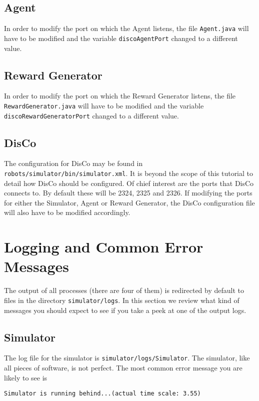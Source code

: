 \documentclass[12pt]{article}
\begin{document}
\subsection{Agent}

In order to modify the port on which the Agent listens, the file 
\verb+Agent.java+ will have to be modified and the variable \verb+discoAgentPort+ changed to a different value.

\subsection{Reward Generator}

In order to modify the port on which the Reward Generator listens, the file 
\verb+RewardGenerator.java+ will have to be modified and the variable 
\verb+discoRewardGeneratorPort+ changed to a different value.


\subsection{DisCo}

The configuration for DisCo may be found in 
\verb+robots/simulator/bin/simulator.xml+. It is beyond the scope of this
tutorial to detail how DisCo should be configured. Of chief interest are the
ports that DisCo connects to. By default these will be 2324, 2325 and 2326.
If modifying the ports for either the Simulator, Agent or Reward Generator,
the DisCo configuration file will also have to be modified accordingly.

\section{Logging and Common Error Messages}

The output of all processes (there are four of them) is redirected by default
to files in the directory \verb+simulator/logs+. In this section we review
what kind of messages you should expect to see if you take a peek at one of
the output logs.

\subsection{Simulator}

The log file for the simulator is \verb+simulator/logs/Simulator+. The 
simulator, like all pieces of software, is not perfect. The most common
error message you are likely to see is

\begin{verbatim}
Simulator is running behind...(actual time scale: 3.55)
\end{verbatim}
\end{document}
